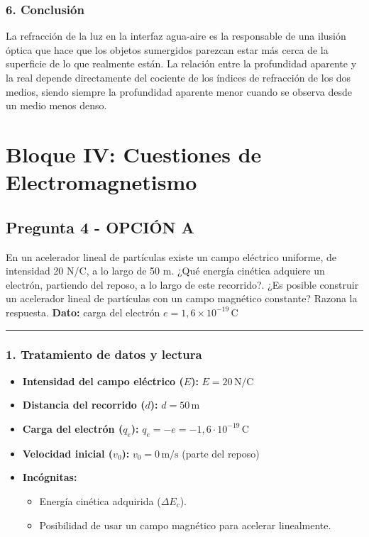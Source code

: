 \subsubsection*{6. Conclusión}
\begin{cajaconclusion}
La refracción de la luz en la interfaz agua-aire es la responsable de una ilusión óptica que hace que los objetos sumergidos parezcan estar más cerca de la superficie de lo que realmente están. La relación entre la profundidad aparente y la real depende directamente del cociente de los índices de refracción de los dos medios, siendo siempre la profundidad aparente menor cuando se observa desde un medio menos denso.
\end{cajaconclusion}

\newpage

\section{Bloque IV: Cuestiones de Electromagnetismo}
\label{sec:em_2002_jun_ord}

\subsection{Pregunta 4 - OPCIÓN A}
\label{subsec:4A_2002_jun_ord}

\begin{cajaenunciado}
En un acelerador lineal de partículas existe un campo eléctrico uniforme, de intensidad 20 N/C, a lo largo de 50 m. ¿Qué energía cinética adquiere un electrón, partiendo del reposo, a lo largo de este recorrido?. ¿Es posible construir un acelerador lineal de partículas con un campo magnético constante? Razona la respuesta.
\textbf{Dato:} carga del electrón $e=1,6\times10^{-19}\,\text{C}$
\end{cajaenunciado}
\hrule

\subsubsection*{1. Tratamiento de datos y lectura}
\begin{itemize}
    \item \textbf{Intensidad del campo eléctrico ($E$):} $E = 20 \, \text{N/C}$
    \item \textbf{Distancia del recorrido ($d$):} $d = 50 \, \text{m}$
    \item \textbf{Carga del electrón ($q_e$):} $q_e = -e = -1,6 \cdot 10^{-19} \, \text{C}$
    \item \textbf{Velocidad inicial ($v_0$):} $v_0 = 0 \, \text{m/s}$ (parte del reposo)
    \item \textbf{Incógnitas:}
        \begin{itemize}
            \item Energía cinética adquirida ($\Delta E_c$).
            \item Posibilidad de usar un campo magnético para acelerar linealmente.
        \end{itemize}
\end{itemize}

